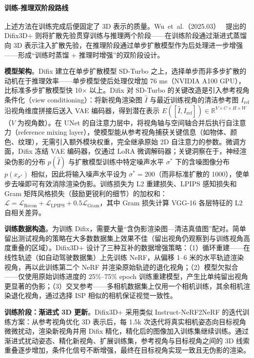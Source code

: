 \paragraph{训练-推理双阶段路线}

上述方法在训练完成后便固定了 3D 表示的质量。Wu~et~al.（2025.03）~\cite{2503_01774} 提出的 Difix3D+ 则将扩散先验贯穿训练与推理两个阶段——在训练阶段通过渐进式蒸馏向 3D 表示注入扩散先验，在推理阶段通过单步扩散模型作为后处理进一步增强——形成“训练时蒸馏 + 推理时增强”的双阶段设计。

\textbf{模型架构}。Difix 建立在单步扩散模型 SD-Turbo 之上，选择单步而非多步扩散的动机在于推理效率——单步模型使后处理仅增加 76 ms（NVIDIA A100 GPU），比标准多步扩散模型快 10$\times$ 以上。Difix 对 SD-Turbo 的关键改造是引入参考视角条件化（view conditioning）：将新视角渲染图 $\hat{I}$ 与最近训练视角的清洁参考图 $I_{\text{ref}}$ 沿视角维度拼接后送入 VAE 编码器，得到潜在表示 $E([\hat{I}, I_{\text{ref}}]) \in \mathbb{R}^{V \times C \times H \times W}$（$V$ 为视角数）。在 UNet 的自注意力层中，将视角轴与空间轴合并后执行自注意力（reference mixing layer），使模型能从参考视角捕获关键信息（如物体、颜色、纹理），无需引入额外模块权重，完全继承原始 2D 自注意力的参数。微调方面，Difix 冻结 VAE 编码器，仅通过 LoRA 微调解码器；关键洞察在于，神经渲染伪影的分布 $p(\hat{I})$ 与扩散模型训练中特定噪声水平 $\sigma^*$ 下的含噪图像分布 $p(x_{\sigma^*})$ 相似，因此将输入噪声水平设为 $\sigma^*=200$（而非标准扩散的 1000），使单步去噪即可有效消除渲染伪影。训练损失为 L2 重建损失、LPIPS 感知损失和 Gram 矩阵风格损失（鼓励更锐利的细节）的加权和：$\mathcal{L} = \mathcal{L}_{\text{Recon}} + \mathcal{L}_{\text{LPIPS}} + 0.5\mathcal{L}_{\text{Gram}}$，其中 Gram 损失计算 VGG-16 各层特征的 L2 自相关差异。

\textbf{训练数据构造}。为训练 Difix，需要大量“含伪影渲染图—清洁真值图”配对。简单留出测试视角的策略在大多数数据集上效果不佳（留出视角仍观察到与训练视角高度重叠的区域）。Difix3D+ 设计了三种互补的数据增强策略：（1）循环重建——在线性轨迹（如自动驾驶数据集）上先训练 NeRF，从偏移 1--6 米的水平轨迹渲染视角，再以此训练第二个 NeRF 并渲染原始轨迹的退化视角；（2）模型欠拟合——仅使用原始训练进度的 25\%--75\% epoch 训练重建模型，产生比单纯留出视角更显著的伪影；（3）交叉参考——多相机数据集上仅用一个相机训练，其余相机渲染退化视角，通过选择 ISP 相似的相机保证视觉一致性。

\textbf{训练阶段：渐进式 3D 更新}。Difix3D+ 采用类似 Instruct-NeRF2NeRF 的迭代训练方案：从参考视角优化 3D 表示后，每 1.5k 次迭代将真实相机姿态向目标视角微微扰动，渲染新视角并用 Difix 精化，精化后的图像加入训练集继续训练。通过渐进式扰动姿态、精化新视角、扩展训练集，参考视角与目标视角之间的 3D 线索重叠逐步增加，条件化信号不断增强，最终在目标视角实现一致且无伪影的渲染。

